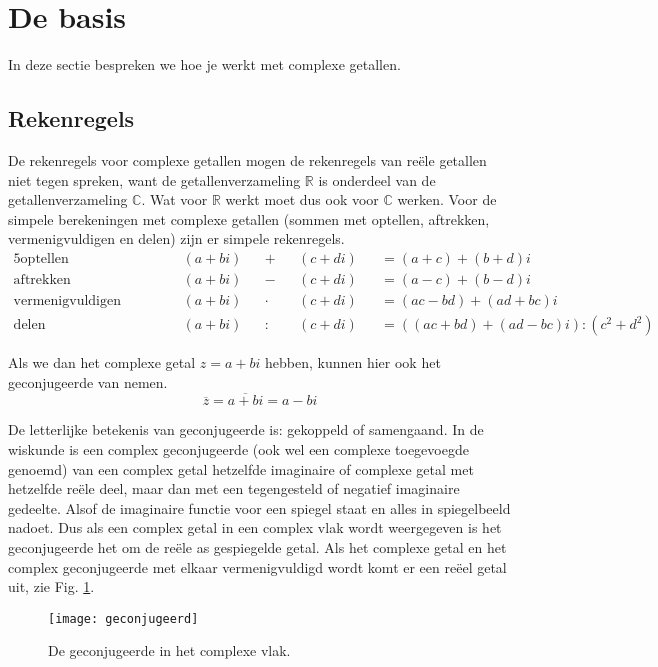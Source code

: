 \documentclass[11pt,fleqn]{book} %
\newcommand*\conj[1]{\overline{#1}}
\begin{document}
\section{De basis}
In deze sectie bespreken we hoe je werkt met complexe getallen.
\subsection{Rekenregels}
De rekenregels voor complexe getallen mogen de rekenregels van reële getallen niet tegen spreken, want de getallenverzameling $\mathbb{R}$ is onderdeel van de getallenverzameling $\mathbb{C}$. Wat voor $\mathbb{R}$ werkt moet dus ook voor $\mathbb{C}$ werken. Voor de simpele berekeningen met complexe getallen (sommen met optellen, aftrekken, vermenigvuldigen en delen) zijn er simpele rekenregels.
\begin{alignat*}{5}
\text{optellen}& \qquad &&(a+bi) &&+ &&(c+di) &&=(a+c)+(b+d)i\\
\text{aftrekken}& \qquad &&(a+bi) &&- &&(c+di) &&=(a-c)+(b-d)i\\
\text{vermenigvuldigen}& \qquad &&(a+bi) &&\cdot &&(c+di) &&=(ac-bd)+(ad+bc)i\\
\text{delen}& \qquad &&(a+bi) &&: &&(c+di) &&=((ac+bd)+(ad-bc)i):(c^2+d^2)
\end{alignat*}

Als we dan het complexe getal $z = a + bi$ hebben, kunnen hier ook het geconjugeerde van nemen.
\begin{displaymath}
\conj{z}=\conj{a+bi}=a-bi
\end{displaymath}

De letterlijke betekenis van geconjugeerde is: gekoppeld of samengaand. In de wiskunde is een complex geconjugeerde (ook wel een complexe toegevoegde genoemd) van een complex getal hetzelfde imaginaire of complexe getal met hetzelfde reële deel, maar dan met een tegengesteld of negatief imaginaire gedeelte. Alsof de imaginaire functie voor een spiegel staat en alles in spiegelbeeld nadoet. Dus als een complex getal in een complex vlak wordt weergegeven is het geconjugeerde het om de reële as gespiegelde getal. Als het complexe getal en het complex geconjugeerde met elkaar vermenigvuldigd wordt komt er een reëel getal uit, zie Fig. \ref{fig:geconjugeerd}.

\begin{figure}[h]
	\centering\texttt{[image: geconjugeerd]}
	\caption{De geconjugeerde in het complexe vlak.}
	\label{fig:geconjugeerd}
\end{figure}
\end{document}
